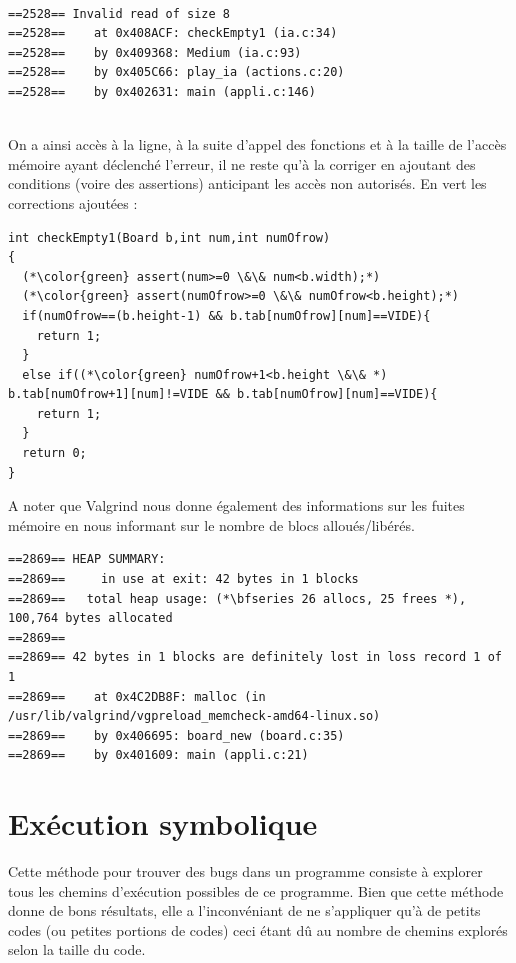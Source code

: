 \documentclass{report}
\begin{document}
\begin{scriptsize}
  \begin{lstlisting}

==2528== Invalid read of size 8
==2528==    at 0x408ACF: checkEmpty1 (ia.c:34)
==2528==    by 0x409368: Medium (ia.c:93)
==2528==    by 0x405C66: play_ia (actions.c:20)
==2528==    by 0x402631: main (appli.c:146)
    
  \end{lstlisting}
\end{scriptsize}

On a ainsi accès à la ligne, à la suite d'appel des fonctions et à la taille de l'accès mémoire ayant déclenché l'erreur, il ne reste qu'à la corriger en ajoutant des conditions (voire des assertions) anticipant les accès non autorisés. En vert les corrections ajoutées :

\begin{scriptsize}
  \begin{lstlisting}
int checkEmpty1(Board b,int num,int numOfrow)
{
  (*\color{green} assert(num>=0 \&\& num<b.width);*)
  (*\color{green} assert(numOfrow>=0 \&\& numOfrow<b.height);*)
  if(numOfrow==(b.height-1) && b.tab[numOfrow][num]==VIDE){
    return 1;
  }
  else if((*\color{green} numOfrow+1<b.height \&\& *) b.tab[numOfrow+1][num]!=VIDE && b.tab[numOfrow][num]==VIDE){
    return 1;
  }
  return 0;
}
  \end{lstlisting}
\end{scriptsize}

A noter que Valgrind nous donne également des informations sur les fuites mémoire en nous informant sur le nombre de blocs alloués/libérés.

\begin{scriptsize}
  \begin{lstlisting}
==2869== HEAP SUMMARY:
==2869==     in use at exit: 42 bytes in 1 blocks
==2869==   total heap usage: (*\bfseries 26 allocs, 25 frees *), 100,764 bytes allocated
==2869== 
==2869== 42 bytes in 1 blocks are definitely lost in loss record 1 of 1
==2869==    at 0x4C2DB8F: malloc (in /usr/lib/valgrind/vgpreload_memcheck-amd64-linux.so)
==2869==    by 0x406695: board_new (board.c:35)
==2869==    by 0x401609: main (appli.c:21)
  \end{lstlisting}
\end{scriptsize}

\section{Exécution symbolique}
Cette méthode pour trouver des bugs dans un programme consiste à explorer tous les chemins d'exécution possibles de ce programme. Bien que cette méthode donne de bons résultats, elle a l'inconvéniant de ne s'appliquer qu'à de petits codes (ou petites portions de codes) ceci étant dû au nombre de chemins explorés selon la taille du code. 
\end{document}
